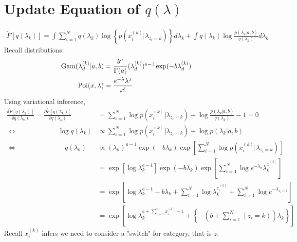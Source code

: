 \documentclass[a4paper,10.5pt,dvipdfmx]{jarticle}  %
\begin{document}
\section{Update Equation of $q(\lambda)$}
\noindent
\begin{align}
	\widetilde{F}[q (\lambda_k)] = \int \sum_{i=1}^{N} q(\lambda_k) \log \left\{ p(x_{i}^{(k)} | \lambda_{z_i=k}) \right\} d\lambda_k + \int q(\lambda_k) \log \frac{p(\lambda_k | a,b)}{q(\lambda_k)} d\lambda_k
\end{align}
\noindent
Recall distributions:
\begin{align}
	{\rm Gam}(\lambda_{d}^{(k)}|a,b) &= \frac{b^a}{\Gamma(a)} (\lambda_{d}^{(k)})^{a-1} \exp (-b \lambda_{d}^{(k)})\\
	{\rm Poi}(x, \lambda) &= \frac{e^{-\lambda} \lambda^x}{x!}
\end{align}
\noindent
Using variational inference,
\begin{align}
	\frac{\delta \widetilde{F}[q(\lambda_k)]}{\delta q(\lambda_k)} = \frac{\partial \widetilde{F}[q(\lambda_k)]}{\partial q(\lambda_k)} &= \sum_{i=1}^{N} \log p(x_{i}^{(k)} | \lambda_{z_i=k}) + \log \frac{p(\lambda_k|a,b)}{q(\lambda_k)} - 1 = 0\\
	\Longleftrightarrow \qquad  \qquad  \qquad \log q(\lambda_k) &\propto \sum_{i=1}^{N} \log p(x_{i}^{(k)} | \lambda_{z_i=k}) + \log p(\lambda_k | a,b)\\
	\Longleftrightarrow \quad  \qquad  \qquad \qquad q(\lambda_k) &\propto (\lambda_k)^{a-1} \exp (-b \lambda_k) \exp \left[ \sum_{i=1}^{N} \log p(x_{i}^{(k)} | \lambda_{z_i=k}) \right]\\
&= \exp \left[ \log \lambda_{k}^{a-1} \right] \exp (-b \lambda_k) \exp \left[ \sum_{i=1}^{N} \log e^{-\lambda_k} \lambda_k^{x_{i}^{(k)}} \right]\\
&= \exp \left[\log \lambda_{k}^{a-1}  - b \lambda_k + \sum_{i=1}^{N} \log \lambda_{k}^{x_{i}^{(k)}} + \sum_{i=1}^{N} \log e^{-\lambda_{z_i=k}} \right]\\
&= \exp \left[ \log \lambda_{k}^{a + \sum_{i=1}^{n} x_{i}^{(k)} -1 } + \left\{ - \left( b + \sum_{i=1}^{N} (z_i=k) \right) \lambda_k \right\} \right]
\end{align}
Recall $x_i^{(k)}$ infers we need to consider a "switch" for category, that is $z$.
\end{document}
